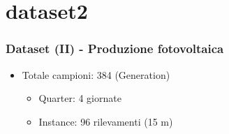 \documentclass{beamer}
\begin{document}
\section{dataset2}
\begin{frame}
    \frametitle{Dataset (II) - Produzione fotovoltaica}
    \vfill
    
    \begin{itemize}
        \item Totale campioni: 384 (Generation) \begin{itemize}   
            \item Quarter: 4 giornate
            \item Instance: 96 rilevamenti (15 m)
        \end{itemize}
    \end{itemize}
    \vfill
    \centering

\end{frame}
\end{document}
